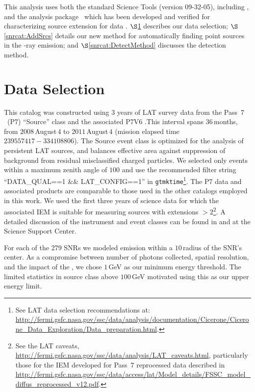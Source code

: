 {This analysis uses both the standard Science Tools (version 09-32-05), including \gtlike{}, and the \ptlike{} analysis package~\citep{Kerr10} which has been developed and verified for characterizing source extension for \FermiLat{} data \citep{Lande12}. $\S$\ref{snrcat:Data} describes our data selection; $\S$\ref{snrcat:AddSrcs} details our new method for automatically finding point sources in the \FermiLat{} \g-ray emission; and $\S$\ref{snrcat:DetectMethod} discusses the detection method.

\section{Data Selection}\label{snrcat:Data}
This catalog was constructed using 3 years of LAT survey data from the Pass~$7$~(P7) ``Source'' class and the associated P7V6 \irf{}.This interval spans $36$\,months, from $2008$\,August\,$4$ to $2011$\,August\,$4$ (mission elapsed time $239557417-334108806$). The Source event class is optimized for the analysis of persistent LAT sources, and balances effective area against suppression of background from residual misclassified charged particles. We selected only events within a maximum zenith angle of $100$\degr{} and use the recommended filter string ``DATA\_QUAL==1 \&\& LAT\_CONFIG==1'' in {\tt gtmktime}\footnote{See LAT data selection recommendations at: \url{http://fermi.gsfc.nasa.gov/ssc/data/analysis/documentation/Cicerone/Cicerone_Data_Exploration/Data_preparation.html}.}. 
The P7 data and associated products are comparable to  those used in the other \gam{} catalogs employed in this work. We used the first three years of science data for which the associated IEM is suitable for measuring sources with extensions $>2$\degr \footnote{See the LAT caveats, \url{http://fermi.gsfc.nasa.gov/ssc/data/analysis/LAT_caveats.html}, particularly those for the IEM developed for Pass~$7$ reprocessed data described in \url{http://fermi.gsfc.nasa.gov/ssc/data/access/lat/Model_details/FSSC_model_diffus_reprocessed_v12.pdf}.}. A detailed discussion of the instrument and event classes can be found in \cite{atwood09} and at the \Fermi{} Science Support Center\footnotemark[1].

For each of the 279 SNRs we modeled emission within a $10$\degr{}\,radius of the SNR's center. As a compromise between number of photons collected, spatial resolution, and the impact of the \iem{}, we chose $1$\,GeV as our minimum energy threshold. The limited statistics in source class above $100$\,GeV motivated using this as our upper energy limit. 

}
